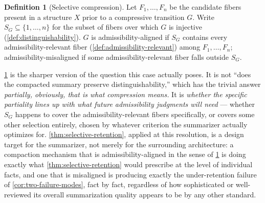 \documentclass[11pt]{book}
\theoremstyle{plain}
\theoremstyle{definition}
\newtheorem{definition}[theorem]{Definition}
\theoremstyle{remark}
\begin{document}
\begin{definition}[Selective compression]
\label{def:selective-compression}
Let $F_1, \dots, F_n$ be the candidate fibers present in a structure
$X$ prior to a compressive transition $G$. Write $S_G \subseteq \{1,
\dots, n\}$ for the subset of fibers over which $G$ is injective
(\cref{def:distinguishability}). $G$ is admissibility-aligned if $S_G$
contains every admissibility-relevant fiber
(\cref{def:admissibility-relevant}) among $F_1, \dots, F_n$;
admissibility-misaligned if some admissibility-relevant fiber falls
outside $S_G$.
\end{definition}

\cref{def:selective-compression} is the sharper version of the
question this case actually poses. It is not \enquote{does the
compacted summary preserve distinguishability,} which has the trivial
answer \emph{partially, obviously, that is what compression means.}
It is \emph{whether the specific partiality lines up with what future
admissibility judgments will need} --- whether $S_G$ happens to cover
the admissibility-relevant fibers specifically, or covers some other
selection entirely, chosen by whatever criterion the summarizer
actually optimizes for. \cref{thm:selective-retention}, applied at
this resolution, is a design target for the summarizer, not merely for
the surrounding architecture: a compaction mechanism that is
admissibility-aligned in the sense of \cref{def:selective-compression}
is doing exactly what \cref{thm:selective-retention} would prescribe
at the level of individual facts, and one that is misaligned is
producing exactly the under-retention failure of
\cref{cor:two-failure-modes}, fact by fact, regardless of how
sophisticated or well-reviewed its overall summarization quality
appears to be by any other standard.
\end{document}
